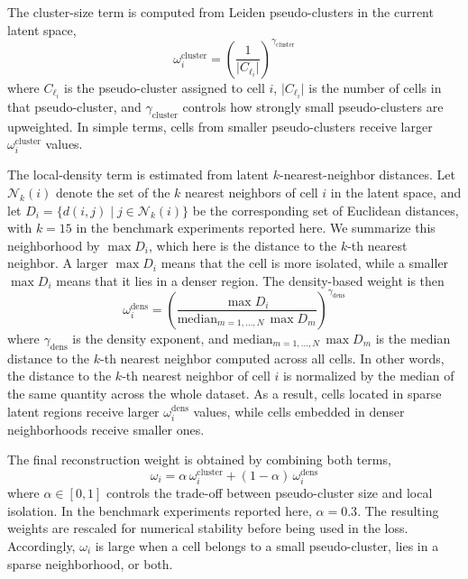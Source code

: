 \documentclass[11pt,a4paper]{article}
\begin{document}
The cluster-size term is computed from Leiden pseudo-clusters in the
current latent space,
\begin{equation}
  \omega^{\mathrm{cluster}}_i
  =
  \left( \frac{1}{\lvert C_{\ell_i} \rvert} \right)^{\gamma_{\mathrm{cluster}}}
\end{equation}
where $C_{\ell_i}$ is the pseudo-cluster assigned to cell $i$,
$\lvert C_{\ell_i} \rvert$ is the number of cells in that
pseudo-cluster, and $\gamma_{\mathrm{cluster}}$ controls how strongly
small pseudo-clusters are upweighted. In simple terms, cells from
smaller pseudo-clusters receive larger $\omega^{\mathrm{cluster}}_i$
values.

The local-density term is estimated from latent
$k$-nearest-neighbor distances. Let $\mathcal{N}_k(i)$ denote the set
of the $k$ nearest neighbors of cell $i$ in the latent space, and let
$D_i = \{d(i,j) \mid j \in \mathcal{N}_k(i)\}$ be the corresponding set
of Euclidean distances, with $k=15$ in the benchmark experiments reported
here. We
summarize this neighborhood by $\max D_i$, which here is the distance
to the $k$-th nearest neighbor. A larger $\max D_i$ means that the cell
is more isolated, while a smaller $\max D_i$ means that it lies in a
denser region. The density-based weight is then
\begin{equation}
  \omega^{\mathrm{dens}}_i
  =
  \left(
    \frac{\max D_i}{\mathrm{median}_{m=1,\ldots,N}\, \max D_m}
  \right)^{\gamma_{\mathrm{dens}}}
\end{equation}
where $\gamma_{\mathrm{dens}}$ is the density exponent, and
$\mathrm{median}_{m=1,\ldots,N}\, \max D_m$ is the median distance to
the $k$-th nearest neighbor computed across all cells. In other words,
the distance to the $k$-th nearest neighbor of cell $i$ is normalized
by the median of the same quantity across the whole dataset. As a
result, cells located in sparse latent
regions receive larger $\omega^{\mathrm{dens}}_i$ values, while cells
embedded in denser neighborhoods receive smaller ones.

The final reconstruction weight is obtained by combining both terms,
\begin{equation}
    \label{eq:omega_weight}
  \omega_i
  =
  \alpha\,\omega^{\mathrm{cluster}}_i
  +
  (1-\alpha)\,\omega^{\mathrm{dens}}_i
\end{equation}
where $\alpha \in [0,1]$ controls the trade-off between pseudo-cluster
size and local isolation. In the benchmark experiments reported here, $\alpha=0.3$.
The resulting weights are
rescaled for numerical stability before being used in the loss. Accordingly, $\omega_i$ is large when a cell belongs to a small
pseudo-cluster, lies
in a sparse neighborhood, or both.
\end{document}
